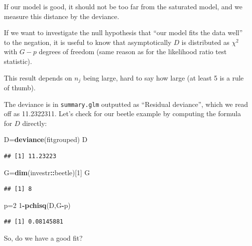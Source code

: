 \documentclass[
  ignorenonframetext,
]{beamer}
\newenvironment{Shaded}{\begin{snugshade}}{\end{snugshade}}
\newcommand{\DecValTok}[1]{\textcolor[rgb]{0.00,0.00,0.81}{#1}}
\newcommand{\FunctionTok}[1]{\textcolor[rgb]{0.13,0.29,0.53}{\textbf{#1}}}
\newcommand{\NormalTok}[1]{#1}
\newcommand{\OtherTok}[1]{\textcolor[rgb]{0.56,0.35,0.01}{#1}}
\newcommand{\SpecialCharTok}[1]{\textcolor[rgb]{0.81,0.36,0.00}{\textbf{#1}}}
\begin{document}
\begin{frame}
If our model is good, it should not be too far from the saturated model,
and we measure this distance by the deviance.

If we want to investigate the null hypothesis that ``our model fits the
data well'' to the negation, it is useful to know that asymptotically
\(D\) is distributed as \(\chi^2\) with \(G-p\) degrees of freedom (same
reason as for the likelihood ratio test statistic).

This result depends on \(n_j\) being large, hard to say how large (at
least 5 is a rule of thumb).
\end{frame}

\begin{frame}[fragile]
The deviance is in \texttt{summary.glm} outputted as ``Residual
deviance'', which we read off as 11.2322311. Let's check for our beetle
example by computing the formula for \(D\) directly:

\begin{Shaded}
\begin{Highlighting}[]
\NormalTok{D}\OtherTok{=}\FunctionTok{deviance}\NormalTok{(fitgrouped)}
\NormalTok{D}
\end{Highlighting}
\end{Shaded}

\begin{verbatim}
## [1] 11.23223
\end{verbatim}

\begin{Shaded}
\begin{Highlighting}[]
\NormalTok{G}\OtherTok{=}\FunctionTok{dim}\NormalTok{(investr}\SpecialCharTok{::}\NormalTok{beetle)[}\DecValTok{1}\NormalTok{]}
\NormalTok{G}
\end{Highlighting}
\end{Shaded}

\begin{verbatim}
## [1] 8
\end{verbatim}

\begin{Shaded}
\begin{Highlighting}[]
\NormalTok{p}\OtherTok{=}\DecValTok{2}
\DecValTok{1}\SpecialCharTok{{-}}\FunctionTok{pchisq}\NormalTok{(D,G}\SpecialCharTok{{-}}\NormalTok{p)}
\end{Highlighting}
\end{Shaded}

\begin{verbatim}
## [1] 0.08145881
\end{verbatim}

So, do we have a good fit?
\end{frame}
\end{document}
